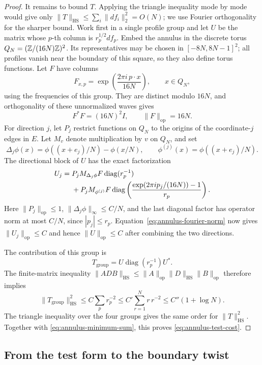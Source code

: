 \begin{proof}
It remains to bound $T$.  Applying the triangle inequality mode by mode
would give only $\|T\|_{\mathrm{HS}}\leq\sum_i\|df_i\|_2^2=O(N)$;
we use Fourier orthogonality for the sharper bound.  Work first in a
single profile group and let $U$ be the matrix whose $p$-th column is
$r_p^{1/2}df_p$.
Embed the annulus in the discrete torus
$Q_N=(\mathbb Z/(16N)\mathbb Z)^2$.  Its representatives may be chosen in
$[-8N,8N-1]^2$; all profiles vanish near the boundary of this square,
so they also define torus functions.  Let $F$ have columns
\[
 F_{x,p}=\exp\left(\frac{2\pi i\,p\cdot x}{16N}\right),
 \qquad x\in Q_N,
\]
using the frequencies of this group.  They are distinct modulo $16N$,
and orthogonality of these unnormalized waves gives
\begin{equation}\label{eq:annulus-fourier-norm}
 F^*F=(16N)^2I,\qquad \|F\|_{\mathrm{op}}=16N.
\end{equation}
For direction $j$, let $P_j$ restrict functions on $Q_N$ to the
origins of the coordinate-$j$ edges in $E$.  Let $M_v$ denote
multiplication by $v$ on $Q_N$, and set
\[
 \Delta_j\phi(x)=\phi((x+e_j)/N)-\phi(x/N),
 \qquad \phi^{(j)}(x)=\phi((x+e_j)/N).
\]
The directional block of $U$ has the exact factorization
\begin{align}\label{eq:annulus-operator-factorization}
 U_j={}&P_jM_{\Delta_j\phi}F
              \operatorname{diag}(r_p^{-1})\notag\\
 &+P_jM_{\phi^{(j)}}F
   \operatorname{diag}\left(
      \frac{\exp(2\pi i p_j/(16N))-1}{r_p}\right).
\end{align}
Here $\|P_j\|_{\mathrm{op}}\leq1$,
$\|\Delta_j\phi\|_\infty\leq C/N$, and the last diagonal factor
has operator norm at most $C/N$, since $|p_j|\leq r_p$.
Equation~\eqref{eq:annulus-fourier-norm} now gives
$\|U_j\|_{\mathrm{op}}\leq C$ and hence
$\|U\|_{\mathrm{op}}\leq C$ after combining the two directions.

The contribution of this group is
\[
 T_{\mathrm{group}}=U\operatorname{diag}(r_p^{-1})U^*.
\]
The finite-matrix inequality
$\|ADB\|_{\mathrm{HS}}\leq
\|A\|_{\mathrm{op}}\|D\|_{\mathrm{HS}}\|B\|_{\mathrm{op}}$
therefore implies
\[
 \|T_{\mathrm{group}}\|_{\mathrm{HS}}^2
 \leq C\sum_p r_p^{-2}
 \leq C'\sum_{r=1}^N r\,r^{-2}
 \leq C''(1+\log N).
\]
The triangle inequality over the four groups gives the same order
for $\|T\|_{\mathrm{HS}}^2$.  Together with
\eqref{eq:annulus-minimum-sum}, this proves
\eqref{eq:annulus-test-cost}.
\end{proof}

\subsection{From the test form to the boundary twist}


